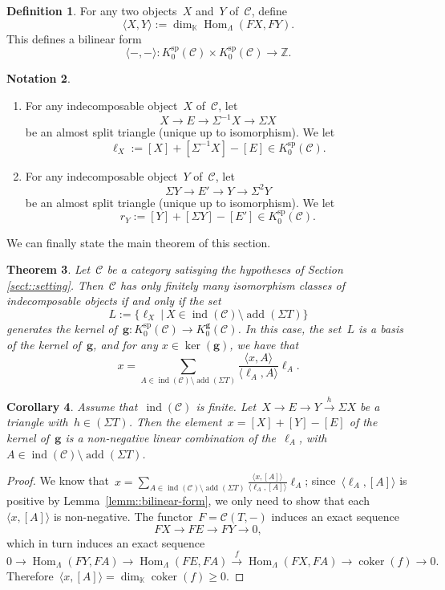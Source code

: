 \documentclass{amsart}
\newtheorem{theorem}{Theorem}[section]
\newtheorem{corollary}[theorem]{Corollary}
\theoremstyle{definition}
\newtheorem{definition}[theorem]{Definition}
\newtheorem{notation}[theorem]{Notation}
\newcommand{\Z}{\mathbb{Z}} %
\renewcommand{\b}[1]{{\boldsymbol{#1}}} %
\newcommand{\pg}[1]{\todo[color=green!30]{#1 \\ \hfill --- PG.}}
\newcommand{\field}{\mathbb{K}}
\newcommand{\cat}{\mathcal{C}}
\newcommand{\Hom}[1]{\operatorname{Hom}_{#1}}
\newcommand{\susp}{\Sigma}
\newcommand{\add}{\operatorname{add}}
\newcommand{\spl}{\operatorname{sp}}
\newcommand{\Ksp}{K_0^{\spl}}
\newcommand{\Kg}{K_0^{\b{g}}}
\newcommand{\ind}{\operatorname{ind}}
\newcommand{\coker}{\operatorname{coker}}
\begin{document}
\begin{definition}
 For any two objects~$X$ and~$Y$ of~$\cat$, define
 \[
  \langle X, Y \rangle := \dim_{\field} \Hom{\Lambda}(FX,FY).
 \]
 This defines a bilinear form
 \[
  \langle -,-\rangle : \Ksp(\cat) \times \Ksp(\cat) \xrightarrow{} \Z.
 \]
\end{definition}

\begin{notation}
\begin{enumerate}
 \item For any indecomposable object~$X$ of~$\cat$, let
 \[
  X \to E \to \susp^{-1} X \to \susp X
 \]
 be an almost split triangle (unique up to isomorphism).  We let
 \[
  \ell_X := [X] + [\susp^{-1} X]  - [E] \in \Ksp(\cat).
 \]
 
 \item For any indecomposable object~$Y$ of~$\cat$, let
 \[
  \susp Y \to E' \to  Y \to \susp^2 Y
 \]
 be an almost split triangle (unique up to isomorphism).  We let
 \[
  r_Y := [Y] + [\susp Y]  - [E'] \in \Ksp(\cat).
 \]
\end{enumerate}
\end{notation}


We can finally state the main theorem of this section. \pg{recall Auslander}

\begin{theorem}\label{theo::relations-g-vecteurs}
 Let~$\cat$ be a category satisying the hypotheses of Section \ref{sect::setting}.  Then~$\cat$ has only finitely many isomorphism classes of indecomposable objects if and only if the set~\[L:=\big\{\ell_X \ | \ X\in \ind(\cat)\setminus \add(\susp T) \big\}\] generates the kernel of~$\b g:\Ksp(\cat) \to \Kg(\cat)$. 
 In this case, the set~$L$ is a basis of the kernel of~$\b g$, and for any $x\in \ker(\b g)$, we have that
 \[
  x= \sum_{A\in \ind(\cat) \setminus \add(\susp T)} \frac{\langle x, A \rangle}{\langle \ell_A, A \rangle} \ell_A.
 \]
\end{theorem}

\begin{corollary}
 Assume that~$\ind(\cat)$ is finite.  Let~$X\xrightarrow{} E \xrightarrow{} Y \xrightarrow{h} \susp X$ be a triangle with~$h\in (\susp T)$.  Then the element~$x=[X]+[Y]-[E]$ of the kernel of~$\b g$ is a non-negative linear combination of the~$\ell_A$, with~$A\in \ind(\cat)\setminus \add(\susp T)$.
\end{corollary}
\begin{proof}
 We know that~$x=\sum_{A\in \ind(\cat)\setminus \add(\susp T)} \frac{\langle x, [A] \rangle}{\langle \ell_A, [A] \rangle} \ell_A$; since~$\langle \ell_A, [A] \rangle$ is positive by Lemma~\ref{lemm::bilinear-form}, we only need to show that each~$\langle x, [A] \rangle$ is non-negative. 
 The functor~$F=\cat(T,-)$ induces an exact sequence
 \[
  FX \to FE \to FY \to 0,
 \]
 which in turn induces an exact sequence
 \[
  0\to \Hom{\Lambda}(FY, FA) \to \Hom{\Lambda}(FE, FA) \xrightarrow{f} \Hom{\Lambda}(FX, FA) \to \coker(f) \to 0.
 \]
 Therefore~$\langle x, [A] \rangle = \dim_{\field} \coker(f) \geq 0$.
\end{proof}
\end{document}
